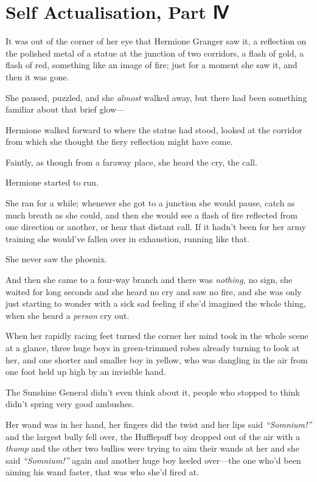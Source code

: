 \chapter{Self Actualisation, Part Ⅳ}

It was out of the corner of her eye that Hermione Granger saw it, a
reflection on the polished metal of a statue at the junction of two
corridors, a flash of gold, a flash of red, something like an image of
fire; just for a moment she saw it, and then it was gone.

She paused, puzzled, and she \emph{almost} walked away, but there had
been something familiar about that brief glow---

Hermione walked forward to where the statue had stood, looked at the
corridor from which she thought the fiery reflection might have come.

Faintly, as though from a faraway place, she heard the cry, the call.

Hermione started to run.

She ran for a while; whenever she got to a junction she would pause,
catch as much breath as she could, and then she would see a flash of
fire reflected from one direction or another, or hear that distant call.
If it hadn't been for her army training she would've fallen over in
exhaustion, running like that.

She never saw the phoenix.

And then she came to a four-way branch and there was \emph{nothing,} no
sign, she waited for long seconds and she heard no cry and saw no fire,
and she was only just starting to wonder with a sick sad feeling if
she'd imagined the whole thing, when she heard a \emph{person} cry out.

When her rapidly racing feet turned the corner her mind took in the
whole scene at a glance, three huge boys in green-trimmed robes already
turning to look at her, and one shorter and smaller boy in yellow, who
was dangling in the air from one foot held up high by an invisible hand.

The Sunshine General didn't even think about it, people who stopped to
think didn't spring very good ambushes.

Her wand was in her hand, her fingers did the twist and her lips said
\emph{``Somnium!''} and the largest bully fell over, the Hufflepuff boy
dropped out of the air with a \emph{thump} and the other two bullies
were trying to aim their wands at her and she said \emph{``Somnium!''}
again and another huge boy keeled over---the one who'd been aiming his
wand faster, that was who she'd fired at.

